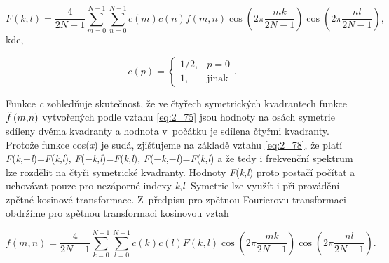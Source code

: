 \begin{equation} \label{eq:2_78} 
    F(k, l) = \frac{4}{2N - 1} \sum\limits_{m=0}^{N-1} \sum\limits_{n=0}^{N-1} c(m)c(n) f(m, n) \cos \left( 2 \pi \frac{mk}{2N-1} \right) \cos \left( 2 \pi \frac{nl}{2N-1}\right),
\end{equation} 
kde,

\begin{equation} \label{eq:2_79} 
    c(p) = \left\{
    \begin{array}{cc}
    1/2, & p = 0 \\
    1, & \mathrm{jinak}
    \end{array}
    \right. .  
\end{equation} 

\noindent Funkce \textit{c} zohledňuje skutečnost, že ve čtyřech symetrických kvadrantech funkce $\tilde{f}\left(m{\rm ,}n\right)$ vytvořených podle vztahu \eqref{eq:2_75} jsou hodnoty na osách symetrie sdíleny dvěma kvadranty a hodnota v~počátku je sdílena čtyřmi kvadranty. Protože funkce cos(\textit{x}) je sudá, zjišťujeme na základě vztahu \eqref{eq:2_78}, že platí \textit{F}(\textit{k},$-$\textit{l})=\textit{F}(\textit{k},\textit{l}), \textit{F}($-$\textit{k},\textit{l})=\textit{F}(\textit{k},\textit{l}), \textit{F}($-$\textit{k},$-$\textit{l})=\textit{F}(\textit{k},\textit{l}) a že tedy i frekvenční spektrum lze rozdělit na čtyři symetrické kvadranty. Hodnoty \textit{F}(\textit{k},\textit{l}) proto postačí počítat a uchovávat pouze pro nezáporné indexy \textit{k},\textit{l}. Symetrie lze využít i při provádění zpětné kosinové transformace. Z~předpisu pro zpětnou Fourierovu transformaci obdržíme pro zpětnou transformaci kosinovou vztah

\begin{equation} \label{eq:2_80}
    f(m, n) = \frac{4}{2N - 1} \sum\limits_{k=0}^{N-1} \sum\limits_{l=0}^{N-1} c(k)c(l) F(k, l) \cos \left( 2 \pi \frac{mk}{2N-1} \right) \cos \left( 2 \pi \frac{nl}{2N-1}\right).
\end{equation} 

